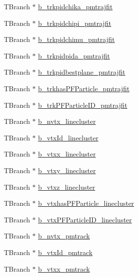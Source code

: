 \begin{DoxyCompactItemize}
\item 
T\-Branch $\ast$ \hyperlink{classanatree_a55878d0d2c89825a394b842aafbd750e}{b\-\_\-trkpidchika\-\_\-pmtrajfit}
\item 
T\-Branch $\ast$ \hyperlink{classanatree_a9ba480fec3a9db28515d7fa626e75053}{b\-\_\-trkpidchipi\-\_\-pmtrajfit}
\item 
T\-Branch $\ast$ \hyperlink{classanatree_a28b3ca9909ebd571ea848e10de9211c1}{b\-\_\-trkpidchimu\-\_\-pmtrajfit}
\item 
T\-Branch $\ast$ \hyperlink{classanatree_acdf6bfe08dc310159742a57820b1f3c8}{b\-\_\-trkpidpida\-\_\-pmtrajfit}
\item 
T\-Branch $\ast$ \hyperlink{classanatree_af6458101534e3a5d775a7bb56ea3d6b3}{b\-\_\-trkpidbestplane\-\_\-pmtrajfit}
\item 
T\-Branch $\ast$ \hyperlink{classanatree_a6677386ec3d5729b7aa090e966fec390}{b\-\_\-trkhas\-P\-F\-Particle\-\_\-pmtrajfit}
\item 
T\-Branch $\ast$ \hyperlink{classanatree_a136a913b9d50584ed3ed9dd179b8c40c}{b\-\_\-trk\-P\-F\-Particle\-I\-D\-\_\-pmtrajfit}
\item 
T\-Branch $\ast$ \hyperlink{classanatree_a2bb40de0d9f4f4d2fc7bd613844f13dc}{b\-\_\-nvtx\-\_\-linecluster}
\item 
T\-Branch $\ast$ \hyperlink{classanatree_a7e4747bf23b621e3ee271b139dde3aef}{b\-\_\-vtx\-Id\-\_\-linecluster}
\item 
T\-Branch $\ast$ \hyperlink{classanatree_a70a10fadb07e0dff76a00e9f02cdb4a4}{b\-\_\-vtxx\-\_\-linecluster}
\item 
T\-Branch $\ast$ \hyperlink{classanatree_ae988c6b98b169d589d76fbba72821617}{b\-\_\-vtxy\-\_\-linecluster}
\item 
T\-Branch $\ast$ \hyperlink{classanatree_a7bb5fd32ae386693303961790df1837a}{b\-\_\-vtxz\-\_\-linecluster}
\item 
T\-Branch $\ast$ \hyperlink{classanatree_ab07e8c7a037d98f785e11583317aab19}{b\-\_\-vtxhas\-P\-F\-Particle\-\_\-linecluster}
\item 
T\-Branch $\ast$ \hyperlink{classanatree_abf79553fcb9213b6c805b3eb8630c449}{b\-\_\-vtx\-P\-F\-Particle\-I\-D\-\_\-linecluster}
\item 
T\-Branch $\ast$ \hyperlink{classanatree_a712ac68eb2df364e326541e83be8982c}{b\-\_\-nvtx\-\_\-pmtrack}
\item 
T\-Branch $\ast$ \hyperlink{classanatree_a902ef4dfb4f5eebeb1617569910f1c5d}{b\-\_\-vtx\-Id\-\_\-pmtrack}
\item 
T\-Branch $\ast$ \hyperlink{classanatree_ab213b75d39115ddbb7200be61e65d06c}{b\-\_\-vtxx\-\_\-pmtrack}

\end{DoxyCompactItemize}
